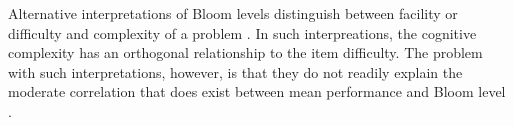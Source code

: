 Alternative interpretations of Bloom levels distinguish between facility or
difficulty and complexity of a problem \cite{hill1981testing,
thompson2008bloom}.  In such interpreations, the cognitive complexity has an
orthogonal relationship to the item difficulty.  The problem with such
interpretations, however, is that they do not readily explain the moderate
correlation that does exist between mean performance and Bloom level
\cite{hill1981testing}.



